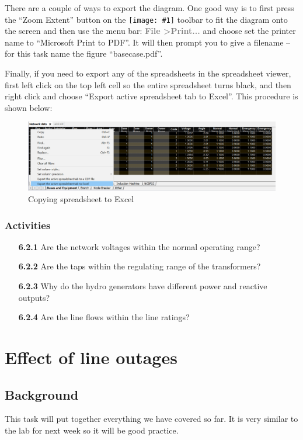 \documentclass[paper=a4, fontsize=11pt]{article}
\newcommand{\mychar}[1]{%
  \begingroup\normalfont
  \texttt{[image: \#1]}%
  \endgroup
}
\begin{document}
\newpage
There are a couple of ways to export the diagram. One good way is to first press the ``Zoom Extent'' button on the \mychar{zoom.png} toolbar to fit the diagram onto the screen and then use the menu bar: \textbf{\textcolor{gray}{File \textgreater \phantom{ }Print...}} and choose set the printer name to ``Microsoft Print to PDF''. It will then prompt you to give a filename -- for this task name the figure ``basecase.pdf''.

Finally, if you need to export any of the spreadsheets in the spreadsheet viewer, first left click on the top left cell so the entire spreadsheet turns black, and then right click and choose ``Export active spreadsheet tab to Excel''. This procedure is shown below:

\begin{figure}[h]
\centering
\includegraphics[scale=0.32]{fig7_excel.pdf}
\caption{Copying spreadsheet to Excel}
\label{fig:7}
\end{figure}

\subsubsection*{Activities}
\begin{enumerate}
\item[\textbf{6.2.1}] Are the network voltages within the normal operating range?
\item[\textbf{6.2.2}] Are the taps within the regulating range of the transformers?
\item[\textbf{6.2.3}] Why do the hydro generators have different power and reactive outputs?
\item[\textbf{6.2.4}] Are the line flows within the line ratings?
\end{enumerate}

\section{Effect of line outages}

\subsection{Background}
This task will put together everything we have covered so far. It is very similar to the lab for next week so it will be good practice.
\end{document}

